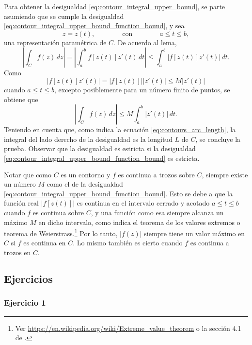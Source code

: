 \documentclass[a4paper]{report}
\begin{document}
Para obtener la desigualdad \ref{eq:contour_integral_upper_bound}, se parte asumiendo que se cumple la desigualdad \ref{eq:contour_integral_upper_bound_function_bound}, y sea 
\[
 z=z(t),\qquad\qquad\textrm{con}\qquad\qquad a\leq t\leq b,
\]
una representación paramétrica de \(C\). De acuerdo al lema,
\[
 \left|\int_{C}f(z)\,dz\right|=\left|\int_a^bf[z(t)]z'(t)\,dt\right|\leq\int_a^b|f[z(t)]z'(t)|\,dt.
\]
Como
\[
 |f[z(t)]z'(t)|=|f[z(t)]||z'(t)|\leq M|z'(t)|
\]
cuando \(a\leq t\leq b\), excepto posiblemente para un número finito de puntos, se obtiene que 
\[
 \left|\int_{C}f(z)\,dz\right|\leq M\int_a^b|z'(t)|\,dt.
\]
Teniendo en cuenta que, como indica la ecuación \ref{eq:contours_arc_length}, la integral del lado derecho de la desigualdad es la longitud \(L\) de \(C\), se concluye la prueba. Observar que la desigualdad es estricta si la desigualdad \ref{eq:contour_integral_upper_bound_function_bound} es estricta.

Notar que como \(C\) es un contorno y \(f\) es continua a trozos sobre \(C\), siempre existe un número \(M\) como el de la desigualdad \ref{eq:contour_integral_upper_bound_function_bound}. Esto se debe a que la función real \(|f[z(t)]|\) es continua en el intervalo cerrado y acotado \(a\leq t\leq b\) cuando \(f\) es continua sobre \(C\), y una función como esa siempre alcanza un máximo \(M\) en dicho intervalo, como indica el teorema de los valores extremos o teorema de Weierstrass.\footnote{Ver \url{https://en.wikipedia.org/wiki/Extreme_value_theorem} o la sección 4.1 de \cite{stewart2016essential}.} Por lo tanto, \(|f(z)|\) siempre tiene un valor máximo en \(C\) si \(f\) es continua en \(C\). Lo mismo también es cierto cuando \(f\) es continua a trozos en \(C\).

\subsection*{Ejercicios}

\subsubsection{Ejercicio 1}
\end{document}
